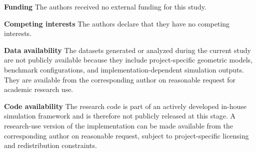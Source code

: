\textbf{Funding} The authors received no external funding for this study.

\textbf{Competing interests} The authors declare that they have no competing interests.

\textbf{Data availability} The datasets generated or analyzed during the current study are not publicly available because they include project-specific geometric models, benchmark configurations, and implementation-dependent simulation outputs. They are available from the corresponding author on reasonable request for academic research use.

\textbf{Code availability} The research code is part of an actively developed in-house simulation framework and is therefore not publicly released at this stage. A research-use version of the implementation can be made available from the corresponding author on reasonable request, subject to project-specific licensing and redistribution constraints.
